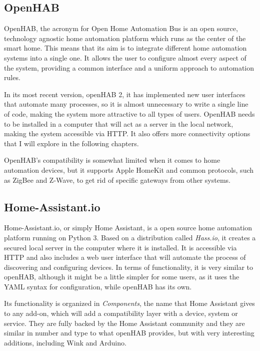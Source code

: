\subsection{OpenHAB}
OpenHAB, the acronym for Open Home Automation Bus is an open source, technology agnostic home automation platform which runs
as the center of the smart home. \cite{openHABDocs} This means that its aim is to integrate different home automation systems into
a single one. It allows the user to configure almost every aspect of the system, providing a common interface and a uniform approach 
to automation rules.

In its most recent version, openHAB 2, it has implemented new user interfaces that automate many processes, so it is almost unnecessary
to write a single line of code, making the system more attractive to all types of users. OpenHAB needs to be installed in a computer that 
will act as a server in the local network, making the system accessible via HTTP. It also offers more connectivity options that I will explore 
in the following chapters.

OpenHAB's compatibility is somewhat limited when it comes to home automation devices, but it supports Apple HomeKit and common 
protocols, such as ZigBee and Z-Wave, to get rid of specific gateways from other systems.\cite{openHABAddons} 

\subsection{Home-Assistant.io}
Home-Assistant.io, or simply Home Assistant, is a open source home automation platform running on Python 3. Based on a distribution
called \textit{Hass.io}, it creates a secured local server in the computer where it is installed. It is accessible via HTTP and also includes
a web user interface that will automate the process of discovering and configuring devices. In terms of functionality, it is very similar to 
openHAB, although it might be a little simpler for some users, as it uses the YAML syntax for configuration, while openHAB has its own.

Its functionality is organized in \textit{Components}, the name that Home Assistant gives to any add-on, which will add a compatibility
layer with a device, system or service. They are fully backed by the Home Assistant community and they are similar in number and type to
what openHAB provides, but with very interesting additions, including Wink and Arduino. 


